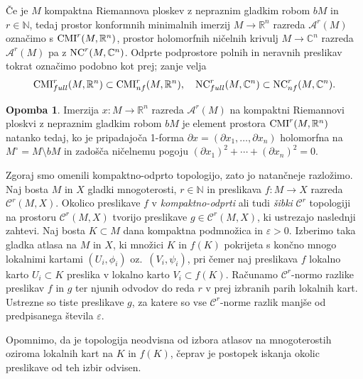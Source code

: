 \documentclass[12pt,a4paper,twoside]{article}
\theoremstyle{definition} %
\newtheorem{opomba}[definicija]{Opomba}
\theoremstyle{plain} %
\numberwithin{equation}{section}  %
\newcommand{\R}{\mathbb R}
\newcommand{\N}{\mathbb N}
\newcommand{\C}{\mathbb C}
\begin{document}
Če je $M$ kompaktna Riemannova ploskev z nepraznim gladkim robom $bM$ in $r \in \N$, tedaj prostor konformnih minimalnih imerzij $M \to \R^{n}$ razreda $\mathcal{A}^{r}(M)$ označimo s $\textup{CMI}^{r}(M, \R^{n})$, prostor holomorfnih ničelnih krivulj $M \to \C^{n}$ razreda $\mathcal{A}^{r}(M)$ pa z $\textup{NC}^{r}(M, \C^{n})$.
Odprte podprostore polnih in neravnih preslikav tokrat označimo podobno kot prej; zanje velja
\begin{gather*}
\textup{CMI}_{full}^{r}(M, \R^{n}) \subset \textup{CMI}_{nf}^{r}(M, \R^{n}), \quad \textup{NC}_{full}^{r}(M, \C^{n}) \subset \textup{NC}_{nf}^{r}(M, \C^{n}).
\end{gather*}

\begin{opomba}
Imerzija $x \colon M \to \mathbb{R}^{n}$ razreda $\mathcal{A}^{r}(M)$ na kompaktni Riemannovi ploskvi z nepraznim gladkim robom $bM$ je element prostora $\textup{CMI}^{r}(M, \R^{n})$ natanko tedaj, ko je pripadajoča 1-forma $\partial x = (\partial x_{1}, \dots , \partial x_{n})$ holomorfna na $M^{\circ} = M \setminus bM$ in zadošča ničelnemu pogoju $(\partial{x_1})^2 + \cdots + (\partial{x_n})^2 = 0$.
\end{opomba}

Zgoraj smo omenili kompaktno-odprto topologijo, zato jo natančneje razložimo.
Naj bosta $M$ in $X$ gladki mnogoterosti, $r \in \mathbb{N}$ in preslikava $f \colon M \to X$ razreda $\mathcal{C}^{r}(M,X)$. 
Okolico preslikave $f$ v \emph{kompaktno-odprti} ali tudi \emph{šibki} $\mathcal{C}^{r}$ topologiji na prostoru $\mathcal{C}^{r}(M,X)$ tvorijo preslikave $g \in \mathcal{C}^{r}(M,X)$, ki ustrezajo naslednji zahtevi. 
Naj bosta $K \subset M$ dana kompaktna podmnožica in $\varepsilon > 0$. Izberimo taka gladka atlasa na $M$ in $X$, ki množici $K$ in $f(K)$ pokrijeta s končno mnogo lokalnimi kartami $(U_{i}, \phi_{i})$ oz.~$(V_{i}, \psi_{i})$, pri čemer naj preslikava $f$ lokalno karto $U_{i} \subset K$ preslika v lokalno karto $V_{i} \subset f(K)$. 
Računamo $\mathcal{C}^{r}$-normo razlike preslikav $f$ in $g$ ter njunih odvodov do reda $r$ v prej izbranih parih lokalnih kart. Ustrezne so tiste preslikave $g$, za katere so vse $\mathcal{C}^{r}$-norme razlik manjše od predpisanega števila $\varepsilon$.

Opomnimo, da je topologija neodvisna od izbora atlasov na mnogoterostih oziroma lokalnih kart na $K$ in $f(K)$, čeprav je postopek iskanja okolic preslikave od teh izbir odvisen.
\end{document}
